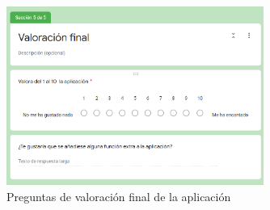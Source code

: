 \begin{figure}[H]
    \centering
    \includegraphics[width=0.75\textwidth]{Images/Capitulo8/Capitulo8.1/val5.png}
    \caption{Preguntas de valoración final de la aplicación}
    \label{fig:preguntas_form_5}
\end{figure}